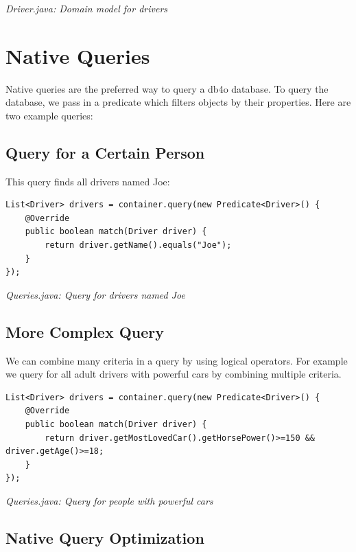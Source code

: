{\small\itshape Driver.java: Domain model for drivers\par}
\medskip

\section{Native Queries}
\label{tut:queries:nativequeries}

Native queries are the preferred way to query a db4o database. To query the database, we pass in a predicate which filters objects by their properties. Here are two example queries:

\subsection*{Query for a Certain Person}

This query finds all drivers named Joe:

\begin{lstlisting}
List<Driver> drivers = container.query(new Predicate<Driver>() {
    @Override
    public boolean match(Driver driver) {
        return driver.getName().equals("Joe");
    }
});
\end{lstlisting}

{\small\itshape Queries.java: Query for drivers named Joe\par}
\medskip

\subsection*{More Complex Query}

We can combine many criteria in a query by using logical operators. For example we query for all adult drivers with powerful cars by combining multiple criteria.

\begin{lstlisting}
List<Driver> drivers = container.query(new Predicate<Driver>() {
    @Override
    public boolean match(Driver driver) {
        return driver.getMostLovedCar().getHorsePower()>=150 && driver.getAge()>=18;
    }
});
\end{lstlisting}

{\small\itshape Queries.java: Query for people with powerful cars\par}
\medskip

\subsection*{Native Query Optimization}

